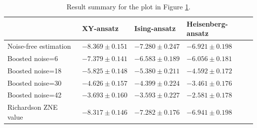 \begin{table}[h]
\caption{Result summary for the plot in Figure \ref{---------------------}.}
\begin{tabular}{@{}llll@{}}
\toprule
  & XY-ansatz  & Ising-ansatz  & Heisenberg-ansatz\\
\midrule
Noise-free estimation & $-8.369 \pm 0.151$ & $-7.280 \pm 0.247$ & $-6.921 \pm 0.198$ \\
\midrule
Boosted noise=6 & $-7.379 \pm 0.141$ & $-6.583 \pm 0.189$ & $-6.056 \pm 0.181$ \\
Boosted noise=18 & $-5.825 \pm 0.148$ & $-5.380 \pm 0.211$ & $-4.592 \pm 0.172$ \\
Boosted noise=30 & $-4.626 \pm 0.157$ & $-4.399 \pm 0.224$ & $-3.461 \pm 0.176$ \\
Boosted noise=42 & $-3.693 \pm 0.160$ & $-3.593 \pm 0.227$ & $-2.581 \pm 0.178$ \\
\midrule
Richardson ZNE value & $-8.317 \pm 0.146$ & $-7.282 \pm 0.176$ & $-6.941 \pm 0.198$ \\
\bottomrule
\end{tabular}
\label{---------------------}
\end{table}